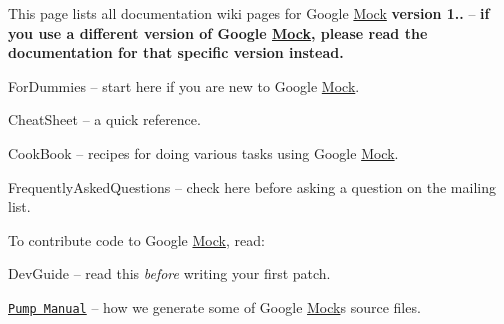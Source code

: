 This page lists all documentation wiki pages for Google \hyperlink{class_mock}{Mock} {\bfseries version 1..} -- {\bfseries if you use a different version of Google \hyperlink{class_mock}{Mock}, please read the documentation for that specific version instead.}


\begin{DoxyItemize}
\item For\+Dummies -- start here if you are new to Google \hyperlink{class_mock}{Mock}.
\item Cheat\+Sheet -- a quick reference.
\item Cook\+Book -- recipes for doing various tasks using Google \hyperlink{class_mock}{Mock}.
\item Frequently\+Asked\+Questions -- check here before asking a question on the mailing list.
\end{DoxyItemize}

To contribute code to Google \hyperlink{class_mock}{Mock}, read\+:


\begin{DoxyItemize}
\item Dev\+Guide -- read this {\itshape before} writing your first patch.
\item \href{http://code.google.com/p/googletest/wiki/PumpManual}{\tt Pump Manual} -- how we generate some of Google \hyperlink{class_mock}{Mock}\textquotesingle{}s source files. 
\end{DoxyItemize}